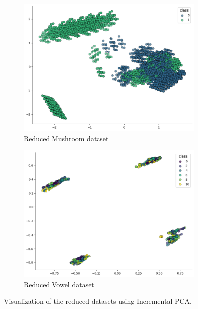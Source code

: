 \begin{figure}[h!]
    \centering
    \begin{subfigure}[b]{0.45\textwidth}
        \centering
        \includegraphics[width=\textwidth]{figures/mushroom_incremental_pca.png}
        \caption{Reduced Mushroom dataset}
        \label{subfig:mushroom_incremental_pca}
    \end{subfigure}
    \hfill
    \begin{subfigure}[b]{0.45\textwidth}
        \centering
        \includegraphics[width=\textwidth]{figures/vowel_incremental_pca.png}
        \caption{Reduced Vowel dataset}
        \label{subfig:vowel_incremental_pca}
    \end{subfigure}
    
    \caption{Visualization of the reduced datasets using Incremental PCA.}
    \label{fig:incremental_pca_datasets}
\end{figure}

